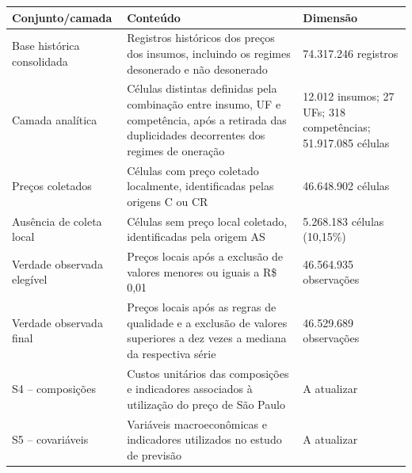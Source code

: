 \begin{quadro}[htb] 
    \caption{Camadas e conjuntos de dados utilizados na pesquisa} 
    \label{qua:conjuntos-dados} 
    \centering 
    \begin{tabular}{p{} p{} p{}} 
        \toprule \textbf{Conjunto/camada} & \textbf{Conteúdo} & \textbf{Dimensão} \\ 
        \midrule 
        Base histórica consolidada 
        & 
        Registros históricos dos preços dos insumos, incluindo os regimes desonerado e não desonerado 
        & 
        74.317.246 registros 
        \\ 
        \addlinespace 
        Camada analítica 
        & 
        Células distintas definidas pela combinação entre insumo, UF e competência, após a retirada das duplicidades 
        decorrentes dos regimes de oneração & 12.012 insumos; 27 UFs; 318 competências; 51.917.085 células 
        \\ 
        \addlinespace 
        Preços coletados 
        & 
        Células com preço coletado localmente, identificadas pelas origens C ou CR 
        & 
        46.648.902 células 
        \\ 
        \addlinespace 
        Ausência de coleta local 
        & 
        Células sem preço local coletado, identificadas pela origem AS & 5.268.183 células (10,15\%) 
        \\ 
        \addlinespace Verdade observada elegível 
        & 
        Preços locais após a exclusão de valores menores ou iguais a R\$ 0,01 
        & 
        46.564.935 observações 
        \\ 
        \addlinespace 
        Verdade observada final 
        & 
        Preços locais após as regras de qualidade e a exclusão de valores superiores a dez vezes a mediana da respectiva série 
        & 
        46.529.689 observações 
        \\ 
        \addlinespace 
        S4 -- composições 
        & 
        Custos unitários das composições e indicadores associados à utilização do preço de São Paulo 
        & 
        A atualizar 
        \\ 
        \addlinespace S5 -- covariáveis 
        & 
        Variáveis macroeconômicas e indicadores utilizados no estudo de previsão 
        & 
        A atualizar 
        \\ 
        \bottomrule 
    \end{tabular} 
     \end{quadro}



